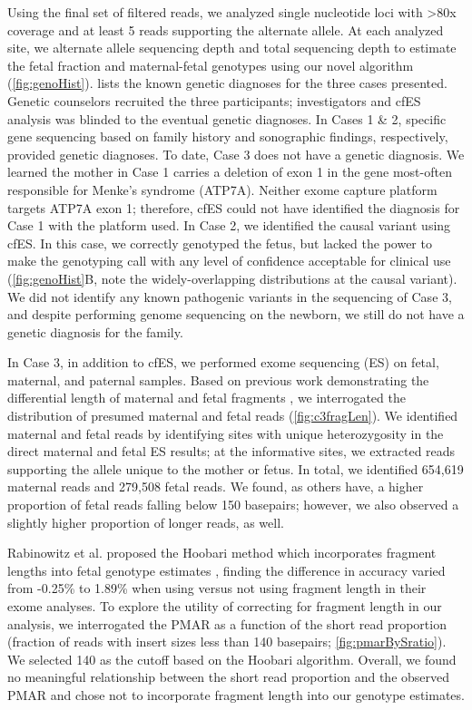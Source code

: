 \documentclass{article}\usepackage[]{graphicx}\usepackage[]{color}
\begin{document}
Using the final set of filtered reads, we analyzed single nucleotide loci with >80x coverage and at least 5 reads supporting the alternate allele.
At each analyzed site, we alternate allele sequencing depth and total sequencing depth to estimate the fetal fraction and maternal-fetal genotypes using our novel algorithm (\cref{fig:genoHist}).
 lists the known genetic diagnoses for the three cases presented.
Genetic counselors recruited the three participants; investigators and cfES analysis was blinded to the eventual genetic diagnoses.
In Cases 1 \& 2, specific gene sequencing based on family history and sonographic findings, respectively, provided genetic diagnoses.
To date, Case 3 does not have a genetic diagnosis.
We learned the mother in Case 1 carries a deletion of exon 1 in the gene most-often responsible for Menke’s syndrome (ATP7A).
Neither exome capture platform targets ATP7A exon 1; therefore, cfES could not have identified the diagnosis for Case 1 with the platform used.
In Case 2, we identified the causal variant using cfES.
In this case, we correctly genotyped the fetus, but lacked the power to make the genotyping call with any level of confidence acceptable for clinical use (\cref{fig:genoHist}B, note the widely-overlapping distributions at the causal variant).
We did not identify any known pathogenic variants in the sequencing of Case 3, and despite performing genome sequencing on the newborn, we still do not have a genetic diagnosis for the family.

In Case 3, in addition to cfES, we performed exome sequencing (ES) on fetal, maternal, and paternal samples.
Based on previous work demonstrating the differential length of maternal and fetal fragments \cite{chan:2004aa,chan:2016aa,jiang:2016ab,rabinowitz:2019aa}, we interrogated the distribution of presumed maternal and fetal reads (\cref{fig:c3fragLen}).
We identified maternal and fetal reads by identifying sites with unique heterozygosity in the direct maternal and fetal ES results; at the informative sites, we extracted reads supporting the allele unique to the mother or fetus.
In total, we identified 654,619 maternal reads and 279,508 fetal reads.
We found, as others have, a higher proportion of fetal reads falling below 150 basepairs; however, we also observed a slightly higher proportion of longer reads, as well.

Rabinowitz et al. proposed the Hoobari method which incorporates fragment lengths into fetal genotype estimates \cite{rabinowitz:2019aa}, finding the difference in accuracy varied from -0.25\% to 1.89\% when using versus not using fragment length in their exome analyses.
To explore the utility of correcting for fragment length in our analysis, we interrogated the PMAR as a function of the short read proportion (fraction of reads with insert sizes less than 140 basepairs; \cref{fig:pmarBySratio}).
We selected 140 as the cutoff based on the Hoobari algorithm.
Overall, we found no meaningful relationship between the short read proportion and the observed PMAR and chose not to incorporate fragment length into our genotype estimates.
\end{document}
